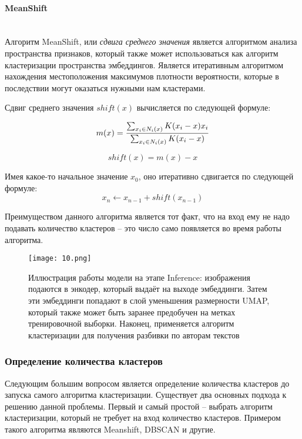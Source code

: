 \paragraph{MeanShift}\mbox{} \\

Алгоритм MeanShift, или \textit{сдвига среднего значения} является алгоритмом анализа пространства признаков, который также может использоваться как алгоритм кластеризации пространства эмбеддингов. Является итеративным алгоритмом нахождения местоположения максимумов плотности вероятности, которые в последствии могут оказаться нужными нам кластерами. 

Сдвиг среднего значения $shift(x)$ вычисляется по следующей формуле:

$$
m(x) = \frac{\sum_{x_i \in N_i(x)} K(x_i - x)x_i}{\sum_{x_i \in N_i(x)} K(x_i - x)}\\
$$

$$
shift(x) = m(x) - x
$$

\noindent
Имея какое-то начальное значение $x_0$, оно итеративно сдвигается по следующей формуле:
$$
x_n \leftarrow x_{n - 1} + shift(x_{n - 1})
$$

Преимуществом данного алгоритма является тот факт, что на вход ему не надо подавать количество кластеров -- это число само появляется во время работы алгоритма.

\begin{figure}[htbp]
    \centering
    \texttt{[image: 10.png]}
    \captionsetup{width=0.9\textwidth}
    \caption{Иллюстрация работы модели на этапе Inference: изображения подаются в энкодер, который выдаёт на выходе эмбеддинги. Затем эти эмбеддинги попадают в слой уменьшения размерности UMAP, который также может быть заранее предобучен на метках тренировочной выборки. Наконец, применяется алгоритм кластеризации для получения разбивки по авторам текстов}
    \label{fig:inference}
\end{figure}

\subsubsection{Определение количества кластеров}

Следующим большим вопросом является определение количества кластеров до запуска самого алгоритма кластеризации. Существует два основных подхода к решению данной проблемы. Первый и самый простой -- выбрать алгоритм кластеризации, который не требует на вход количество кластеров. Примером такого алгоритма являются Meanshift, DBSCAN и другие.

